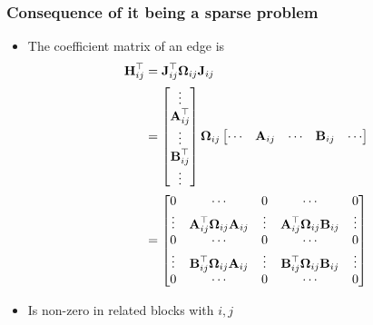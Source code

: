     \begin{frame}
    \frametitle{Consequence of it being a sparse problem}
    \small
    \begin{itemize}
    \item The coefficient matrix of an edge is
     \begin{align*}
     \boldsymbol{\mathbf{H}}_{ij}^{\top} &= \boldsymbol{\mathbf{J}}_{ij}^{\top}\boldsymbol{\mathbf{\Omega}}_{ij}\boldsymbol{\mathbf{J}}_{ij}\\
     &=
     \begin{bmatrix}
     \vdots \\
     \boldsymbol{\mathbf{A}}_{ij}^{\top}\\
     \vdots \\
     \boldsymbol{\mathbf{B}}_{ij}^{\top}\\
     \vdots
     \end{bmatrix} \boldsymbol{\mathbf{\Omega}}_{ij}
     \begin{bmatrix}
     \cdots & \boldsymbol{\mathbf{A}}_{ij} & \cdots & \boldsymbol{\mathbf{B}}_{ij} & \cdots
     \end{bmatrix}\\
     &=
     \begin{bmatrix}
     0 & \cdots & 0 & \cdots & 0 \\
     \vdots & \boldsymbol{\mathbf{A}}_{ij}^{\top}\boldsymbol{\mathbf{\Omega}}_{ij}\boldsymbol{\mathbf{A}}_{ij} & \vdots & \boldsymbol{\mathbf{A}}_{ij}^{\top}\boldsymbol{\mathbf{\Omega}}_{ij}\boldsymbol{\mathbf{B}}_{ij} & \vdots\\
     0 & \cdots & 0 & \cdots & 0 \\
     \vdots & \boldsymbol{\mathbf{B}}_{ij}^{\top}\boldsymbol{\mathbf{\Omega}}_{ij}\boldsymbol{\mathbf{A}}_{ij} & \vdots & \boldsymbol{\mathbf{B}}_{ij}^{\top}\boldsymbol{\mathbf{\Omega}}_{ij}\boldsymbol{\mathbf{B}}_{ij} & \vdots\\
     0 & \cdots & 0 & \cdots & 0
     \end{bmatrix}
     \end{align*}
     \item Is non-zero in related blocks with $i,j$
    \end{itemize}
    
    \end{frame}
    
